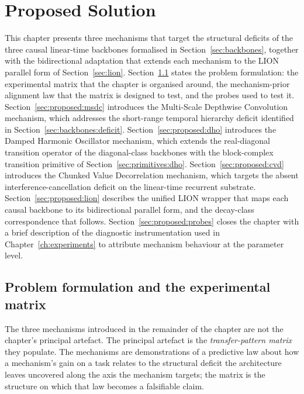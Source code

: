 \chapter{Proposed Solution}\label{ch:proposed}

This chapter presents three mechanisms that target the structural
deficits of the three causal linear-time backbones formalised in
Section~\ref{sec:backbones}, together with the bidirectional
adaptation that extends each mechanism to the LION parallel form of
Section~\ref{sec:lion}. Section~\ref{sec:proposed:matrix} states the
problem formulation: the experimental matrix that the chapter is
organised around, the mechanism-prior alignment law that the matrix
is designed to test, and the probes used to test it.
Section~\ref{sec:proposed:msdc} introduces the Multi-Scale Depthwise
Convolution mechanism, which addresses the short-range temporal
hierarchy deficit identified in
Section~\ref{sec:backbones:deficit}. Section~\ref{sec:proposed:dho}
introduces the Damped Harmonic Oscillator mechanism, which extends
the real-diagonal transition operator of the diagonal-class backbones
with the block-complex transition primitive of
Section~\ref{sec:primitives:dho}. Section~\ref{sec:proposed:cvd}
introduces the Chunked Value Decorrelation mechanism, which targets
the absent interference-cancellation deficit on the linear-time
recurrent substrate. Section~\ref{sec:proposed:lion} describes the
unified LION wrapper that maps each causal backbone to its
bidirectional parallel form, and the decay-class correspondence that
follows. Section~\ref{sec:proposed:probes} closes the chapter with a
brief description of the diagnostic instrumentation used in
Chapter~\ref{ch:experiments} to attribute mechanism behaviour at the
parameter level.

\section{Problem formulation and the experimental matrix}\label{sec:proposed:matrix}

The three mechanisms introduced in the remainder of the chapter are
not the chapter's principal artefact. The principal artefact is the
\textit{transfer-pattern matrix} they populate. The mechanisms are
demonstrations of a predictive law about how a mechanism's gain on a
task relates to the structural deficit the architecture leaves
uncovered along the axis the mechanism targets; the matrix is the
structure on which that law becomes a falsifiable claim.

